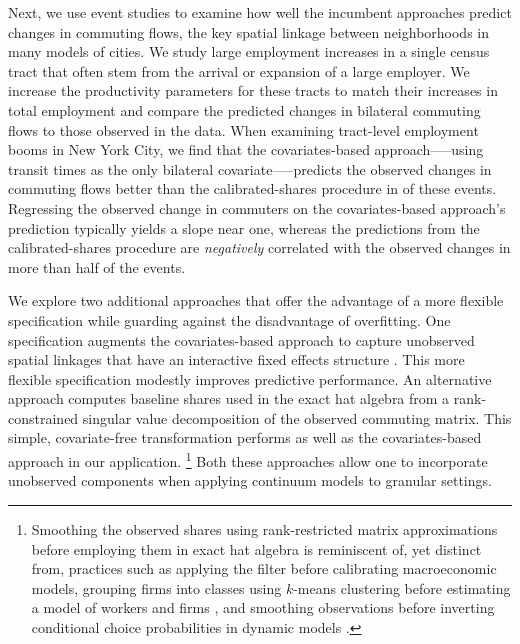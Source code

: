 \documentclass[11pt]{article}
\theoremstyle{definition}
\begin{document}
Next, we use event studies to examine how well the incumbent approaches predict changes in commuting flows,
the key spatial linkage between neighborhoods in many models of cities.
We study large employment increases in a single census tract 
that often stem from the arrival or expansion of a large employer.
We increase the productivity parameters for these tracts to match their increases in total employment and compare the predicted changes in bilateral commuting flows to those observed in the data.
When examining  tract-level employment booms in New York City, 
we find that the covariates-based approach—--using transit times as the only bilateral covariate—--predicts the observed changes in commuting flows better than the calibrated-shares procedure in  of these events.
Regressing the observed change in commuters on the covariates-based approach's prediction typically yields a slope near one,
whereas the predictions from the calibrated-shares procedure are \textit{negatively} correlated with the observed changes in more than half of the events.

We explore two additional approaches that offer the advantage of a more flexible specification while guarding against the disadvantage of overfitting.
One specification augments the covariates-based approach to capture unobserved spatial linkages that have an interactive fixed effects structure \citep{bai2009panel,chen2021nonlinear}.
This more flexible specification modestly improves predictive performance.
An alternative approach computes baseline shares used in the exact hat algebra from a rank-constrained singular value decomposition of the observed commuting matrix.
This simple, covariate-free transformation performs as well as the covariates-based approach in our application.%
\footnote{
    Smoothing the observed shares using rank-restricted matrix approximations before employing them in exact hat algebra
    is reminiscent of, yet distinct from,
    practices such as
    applying the \cite{HodrickPrescott:1997} filter before calibrating macroeconomic models,
    grouping firms into classes using $k$-means clustering before estimating a model of workers and firms \citep{BonhommeLamadonManresa:2019},
    and
    smoothing observations before inverting conditional choice probabilities in dynamic models 
    \citep[e.g.,][]{Kalouptsidi:2014,Hsiao:2022}. 
}
Both these approaches
allow one to incorporate unobserved components when applying continuum models to granular settings.
\end{document}
